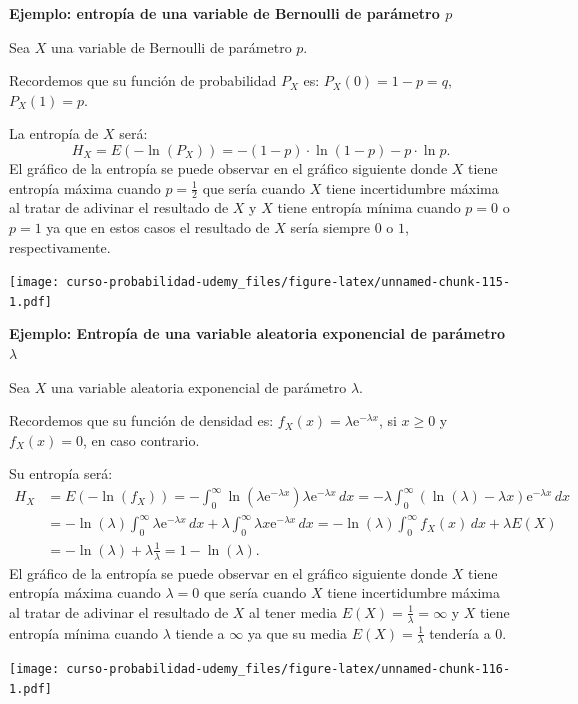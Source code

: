 \documentclass[]{book}
\begin{document}
\textbf{Ejemplo: entropía de una variable de Bernoulli de parámetro \(p\)}

Sea \(X\) una variable de Bernoulli de parámetro \(p\).

Recordemos que su función de probabilidad \(P_X\) es: \(P_X(0)=1-p=q,\) \(P_X(1)=p\).

La entropía de \(X\) será:
\[
H_X = E\left(-\ln(P_X)\right) = -(1-p)\cdot \ln(1-p)-p\cdot \ln p.
\]
El gráfico de la entropía se puede observar en el gráfico siguiente donde \(X\) tiene entropía máxima cuando \(p=\frac{1}{2}\) que sería cuando \(X\) tiene incertidumbre máxima al tratar de adivinar el resultado de \(X\) y \(X\) tiene entropía mínima cuando \(p=0\) o \(p=1\) ya que en estos casos el resultado de \(X\) sería siempre \(0\) o \(1\), respectivamente.

\texttt{[image: curso-probabilidad-udemy\_files/figure-latex/unnamed-chunk-115-1.pdf]}

\textbf{Ejemplo: Entropía de una variable aleatoria exponencial de parámetro \(\lambda\)}

Sea \(X\) una variable aleatoria exponencial de parámetro \(\lambda\).

Recordemos que su función de densidad es: \(f_X(x)=\lambda \mathrm{e}^{-\lambda x}\), si \(x\geq 0\) y \(f_X(x)=0\), en caso contrario.

Su entropía será:
\[
\begin{array}{rl}
H_X & = E\left(-\ln(f_X)\right)=-\int_0^\infty \ln\left(\lambda\mathrm{e}^{-\lambda x}\right)\lambda\mathrm{e}^{-\lambda x}\, dx = -\lambda \int_0^\infty (\ln(\lambda) -\lambda x)\mathrm{e}^{-\lambda x}\, dx \\ & = -\ln (\lambda)\int_0^\infty \lambda\mathrm{e}^{-\lambda x}\, dx+\lambda \int_0^\infty \lambda x \mathrm{e}^{-\lambda x}\, dx =-\ln(\lambda)\int_0^\infty f_X(x)\, dx +\lambda E(X)\\ & =-\ln(\lambda)+\lambda \frac{1}{\lambda} =1-\ln(\lambda).
\end{array}
\]
El gráfico de la entropía se puede observar en el gráfico siguiente donde \(X\) tiene entropía máxima cuando \(\lambda=0\) que sería cuando \(X\) tiene incertidumbre máxima al tratar de adivinar el resultado de \(X\) al tener media \(E(X)=\frac{1}{\lambda}=\infty\) y \(X\) tiene entropía mínima cuando \(\lambda\) tiende a \(\infty\) ya que su media \(E(X)=\frac{1}{\lambda}\) tendería a 0.

\texttt{[image: curso-probabilidad-udemy\_files/figure-latex/unnamed-chunk-116-1.pdf]}
\end{document}
